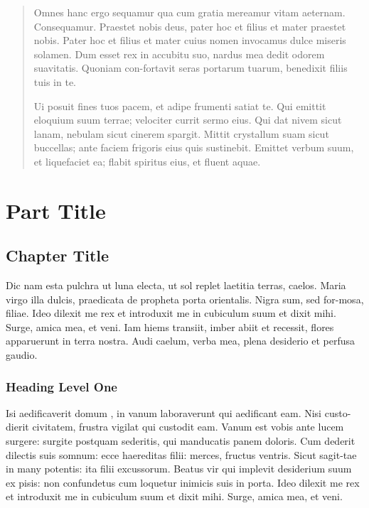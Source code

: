 \documentclass[pdftex,crc]{ios-book}
\begin{document}
\begin{frontmatter}

\begin{abstract}
Omnes hanc ergo sequamur qua cum gratia mereamur vitam aeternam.
Consequamur. Praestet nobis deus, pater hoc et filius et mater
praestet nobis.  Pater hoc et filius et mater cuius nomen invocamus
dulce miseris solamen. Dum esset rex in accubitu suo, nardus mea
dedit odorem suavitatis. Quoniam con-fortavit seras portarum tuarum,
benedixit filiis tuis in te.

Ui posuit fines tuos pacem,
et adipe frumenti satiat te. Qui emittit eloquium suum terrae;
velociter currit sermo eius.  Qui dat nivem sicut lanam, nebulam
sicut cinerem spargit. Mittit crystallum suam sicut buccellas; ante
faciem frigoris eius quis sustinebit. Emittet verbum suum, et
liquefaciet ea; flabit spiritus eius, et fluent aquae.
\end{abstract}

\setcounter{tocdepth}{0}
\tableofcontents

\end{frontmatter}



\part{Part Title}

\chapter{Chapter Title}

Dic nam esta pulchra ut luna electa, ut sol replet laetitia terras,
caelos. Maria virgo illa dulcis, praedicata de propheta porta
orientalis. Nigra sum, sed for-mosa, filiae. Ideo dilexit me rex et
introduxit me in cubiculum suum et dixit mihi. Surge, amica mea, et
veni. Iam hiems transiit, imber abiit et recessit, flores apparuerunt in
terra nostra. Audi caelum, verba mea, plena desiderio et perfusa gaudio.


\section{Heading Level One}

Isi aedificaverit domum \cite{r1,r2,r3}, in vanum \cite{r1} laboraverunt qui aedificant eam.
Nisi custo-dierit civitatem, frustra vigilat qui custodit eam. Vanum
est vobis ante lucem surgere: surgite postquam sederitis, qui
manducatis panem doloris. Cum dederit dilectis suis somnum: ecce
haereditas filii: merces, fructus ventris. Sicut sagit-tae in many
potentis: ita filii excussorum. Beatus vir qui implevit desiderium
suum ex pisis: non confundetus cum loquetur inimicis suis in porta.
Ideo dilexit me rex et introduxit me in cubiculum suum et dixit mihi.
Surge, amica mea, et veni.
\end{document}
